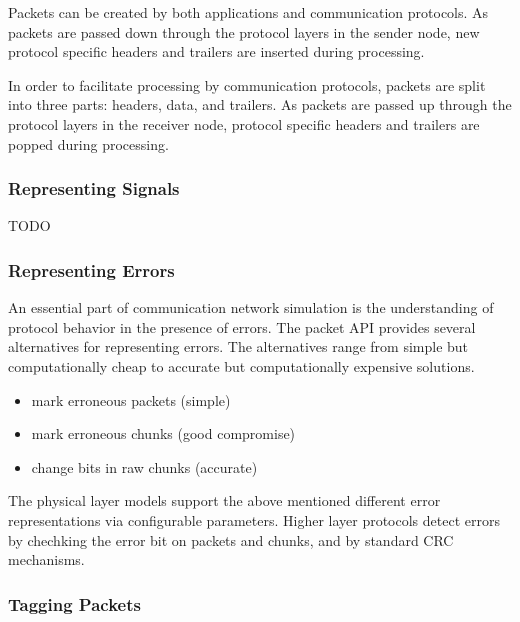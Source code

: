 Packets can be created by both applications and communication protocols. As
packets are passed down through the protocol layers in the sender node, new
protocol specific headers and trailers are inserted during processing.


In order to facilitate processing by communication protocols, packets are
split into three parts: headers, data, and trailers. As packets are passed
up through the protocol layers in the receiver node, protocol specific
headers and trailers are popped during processing.


\subsubsection*{Representing Signals}

TODO


\subsubsection*{Representing Errors}

An essential part of communication network simulation is the understanding
of protocol behavior in the presence of errors. The packet API provides
several alternatives for representing errors. The alternatives range from
simple but computationally cheap to accurate but computationally expensive
solutions.

\begin{itemize}
    \item   mark erroneous packets (simple)
    \item   mark erroneous chunks (good compromise)
    \item   change bits in raw chunks (accurate)
\end{itemize}


The physical layer models support the above mentioned different error
representations via configurable parameters. Higher layer protocols detect
errors by chechking the error bit on packets and chunks, and by standard
CRC mechanisms.

\subsubsection*{Tagging Packets}

